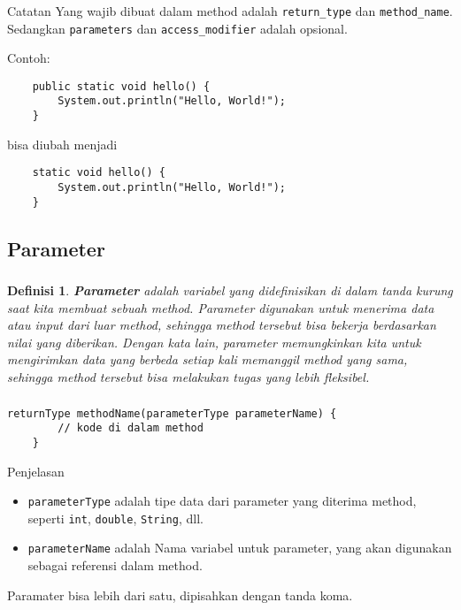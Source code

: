 \documentclass[aspectratio=169]{beamer}
\newtheorem*{definisi}{Definisi}
\theoremstyle{definition}
\begin{document}
    \begin{frame}[fragile]
        \frametitle{\insertsection}
        \framesubtitle{\insertsubsection}
        \begin{alertblock}{Catatan}
            Yang wajib dibuat dalam method adalah \texttt{return\_type} dan \texttt{method\_name}. Sedangkan \texttt{parameters} dan \texttt{access\_modifier} adalah opsional.
        \end{alertblock}
        Contoh:
        \begin{lstlisting}
    public static void hello() {
        System.out.println("Hello, World!");
    }
        \end{lstlisting}
    bisa diubah menjadi
        \begin{lstlisting}
    static void hello() {
        System.out.println("Hello, World!");
    }
        \end{lstlisting}
    \end{frame}

    \subsection{Parameter}
    \begin{frame}[fragile]
        \frametitle{\insertsection}
        \framesubtitle{\insertsubsection}
        \begin{definisi}
            \textbf{Parameter} adalah variabel yang didefinisikan di dalam tanda kurung saat kita membuat sebuah method. Parameter digunakan untuk menerima data atau input dari luar method, sehingga method tersebut bisa bekerja berdasarkan nilai yang diberikan. Dengan kata lain, parameter memungkinkan kita untuk mengirimkan data yang berbeda setiap kali memanggil method yang sama, sehingga method tersebut bisa melakukan tugas yang lebih fleksibel.
        \end{definisi}
    \end{frame}

    \begin{frame}[fragile]
        \frametitle{\insertsection}
        \framesubtitle{\insertsubsection}
        \begin{lstlisting}[caption={Parameter pada Method}]
    returnType methodName(parameterType parameterName) {
        // kode di dalam method
    }
        \end{lstlisting}
        \begin{block}{Penjelasan}
            \begin{itemize}[label=$\blacktriangleright$]
                \item \texttt{parameterType} adalah tipe data dari parameter yang diterima method, seperti \texttt{int}, \texttt{double}, \texttt{String}, dll.
                \item \texttt{parameterName} adalah Nama variabel untuk parameter, yang akan digunakan sebagai referensi dalam method.
            \end{itemize}
            Paramater bisa lebih dari satu, dipisahkan dengan tanda koma.
        \end{block}
    \end{frame}
\end{document}
